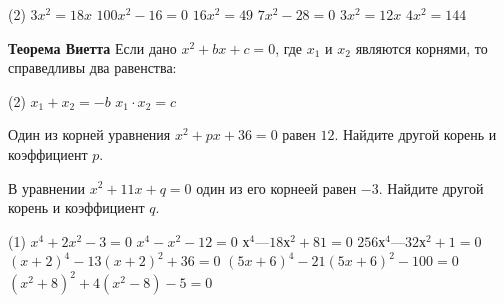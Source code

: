 \begin{class}[number=2]
	\begin{listofex}
		\item \begin{tasks}(2)
			\task \( 3x^{2}=18x \)
			\task \( 100x^{2}-16=0 \)
			\task \( 16x^{2}=49 \)
			\task \( 7x^{2}-28=0 \)
			\task \( 3x^{2}=12x \)
			\task \( 4x^{2}=144 \)
			
		\end{tasks}
	\end{listofex}
		\begin{definit}
			\textbf{Теорема Виетта} Если дано \( x^{2} + bx + c = 0 \), где \( x_{1} \) и \( x_{2} \) являются корнями, то справедливы два равенства: 
			\begin{tasks}(2)
				\task[] \( x_{1}+x_{2}=-b \)
				\task[] \( x_{1}\cdot x_{2}=c \)
			\end{tasks}
		\end{definit}
	\begin{listofex}[resume]
		\item Один из корней уравнения \( x^{2}+px+36=0 \) равен \( 12 \). Найдите другой корень и коэффициент \( p \).
		\item В уравнении \( x^{2}+11x+q=0 \)  один из его корнеей равен \( -3 \). Найдите другой корень и коэффициент \( q \).
		\item \begin{tasks}(1)
			\task \( x^{4}+2x^{2}-3=0 \)
			\task \( x^{4}-x^{2}-12=0 \)
			\task \(  х^{4}  — 18х^{2} + 81=0 \)
			\task \( 256х^{4}  — 32х^{2} +1=0 \)
			\task \( (x+2)^{4}-13(x+2)^{2}+36=0 \)
			\task \( (5x+6)^{4}-21(5x+6)^{2}-100=0 \)
			\task \( (x^{2}+8)^{2}+4(x^{2}-8)-5=0 \)
		\end{tasks}
	\end{listofex}
\end{class}

